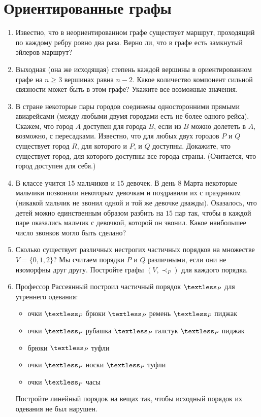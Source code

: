 \documentclass[12pt]{article}
\begin{document}
	\section{Ориентированные графы}
	\begin{enumerate}[label={\textbf{\arabic{section}.\arabic*}}]
		\item Известно, что в неориентированном графе существует маршрут, проходящий по каждому ребру ровно два раза. Верно ли, что в графе есть замкнутый эйлеров маршрут?
		
		\item Выходная (она же исходящая) степень каждой вершины в ориентированном графе на $n \geqslant 3$ вершинах равна $n - 2$. Какое количество компонент сильной связности может быть в этом графе? Укажите все возможные значения.
		
		\item В стране некоторые пары городов соединены односторонними прямыми авиарейсами (между любыми двумя городами есть не более одного рейса). Скажем, что город $A$ доступен для города $B$, если из $B$ можно долететь в $A$, возможно, с пересадками. Известно, что для любых двух городов $P$ и $Q$ существует город $R$, для которого и $P$, и $Q$ доступны. Докажите, что существует город, для которого доступны все города страны. (Считается, что город доступен для себя.)
		
		\item В классе учится $15$ мальчиков и $15$ девочек. В день $8$ Марта некоторые мальчики позвонили некоторым девочкам и поздравили их с праздником (никакой мальчик не звонил одной и той же девочке дважды). Оказалось, что детей можно единственным образом разбить на $15$ пар так, чтобы в каждой паре оказались мальчик с девочкой, которой он звонил. Какое наибольшее число звонков могло быть сделано?
		
		\item Сколько существует различных нестрогих частичных порядков на множестве $V = \{0, 1, 2\}$? Мы считаем порядки $P$ и $Q$ различными, если они не изоморфны друг другу. Постройте графы $(V, \prec_P)$ для каждого порядка.
		
		\item Профессор Рассеянный построил частичный порядок $\textless_P$ для утреннего одевания:
		\begin{itemize}
			\item[] очки $\textless_P$ брюки $\textless_P$ ремень $\textless_P$ пиджак
			\item[] очки $\textless_P$ рубашка $\textless_P$ галстук $\textless_P$ пиджак
			\item[] брюки $\textless_P$ туфли
			\item[] очки $\textless_P$ носки $\textless_P$ туфли
			\item[] очки $\textless_P$ часы
		\end{itemize}
		Постройте линейный порядок на вещах так, чтобы исходный порядок их одевания не был нарушен.
		

\end{enumerate}
\end{document}
